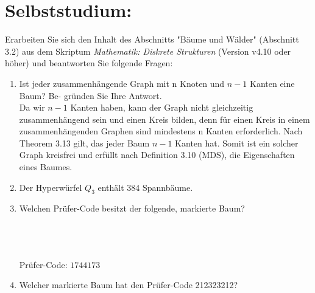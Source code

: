     \section*{Selbststudium:}
        Erarbeiten Sie sich den Inhalt des Abschnitts "Bäume und Wälder" (Abschnitt 3.2) aus dem
        Skriptum \textit{Mathematik: Diskrete Strukturen} (Version v4.10 oder höher) und beantworten Sie
        folgende Fragen:
    \begin{enumerate}[label=(\alph*)]
        \item Ist jeder zusammenhängende Graph mit n Knoten und $n - 1$ Kanten eine Baum? Be-
        gründen Sie Ihre Antwort.\\
        Da wir $n-1$ Kanten haben, kann der Graph nicht gleichzeitig zusammenhängend sein und einen Kreis bilden, 
        denn für einen Kreis in einem zusammenhängenden Graphen sind mindestens n Kanten erforderlich. Nach Theorem 3.13
        gilt, das jeder Baum $n-1$ Kanten hat. Somit ist ein solcher Graph kreisfrei und erfüllt nach Definition 3.10
        (MDS), die Eigenschaften eines Baumes. 

        \item Der Hyperwürfel $Q_3$ enthält 384 Spannbäume. %

        \item Welchen Prüfer-Code besitzt der folgende, markierte Baum?\\\\
        \\\\
        Prüfer-Code: $1744173$

        \item Welcher markierte Baum hat den Prüfer-Code 212323212?\\\\
\end{enumerate}
